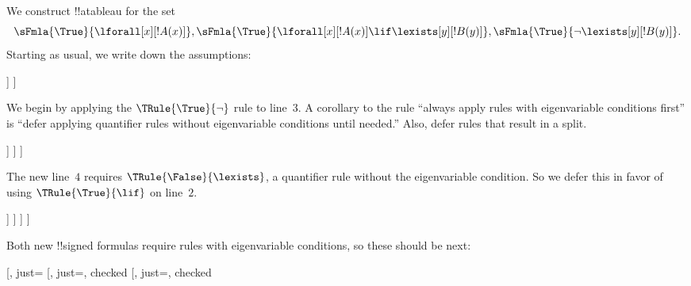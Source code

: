 \documentclass[../../../include/open-logic-section]{subfiles}
\begin{document}
\begin{ex}
We construct !!a{tableau} for the set
\[
\sFmla{\True}{\lforall[x][!A(x)]}, \sFmla{\True}{\lforall[x][!A(x)] 
  \lif \lexists[y][!B(y)]}, \sFmla{\True}{\lnot\lexists[y][!B(y)]}.
\]
Starting as usual, we write down the assumptions:
\begin{oltableau}
  [\sFmla{\True}{\lforall[x][\formula{A}(x)]}, just=\TAss
    [\sFmla{\True}{\lforall[x][\formula{A}(x)] \lif
        \lexists[y][\formula{B}(y)]}, just=\TAss
      [\sFmla{\True}{\lnot\lexists[y][\formula{B}(y)]}, just=\TAss
      ]
    ]
  ]
\end{oltableau}
We begin by applying the $\TRule{\True}{\lnot}$ rule to line~$3$. A
corollary to the rule ``always apply rules with eigenvariable
conditions first'' is ``defer applying quantifier rules without
eigenvariable conditions until needed.'' Also, defer rules that result
in a split.
\begin{oltableau}
  [\sFmla{\True}{\lforall[x][\formula{A}(x)]}, just=\TAss
    [\sFmla{\True}{\lforall[x][\formula{A}(x)] \lif
        \lexists[y][\formula{B}(y)]}, just=\TAss
      [\sFmla{\True}{\lnot\lexists[y][\formula{B}(y)]}, just=\TAss, checked
        [\sFmla{\False}{\lexists[y][\formula{B}(y)]}, just={\TRule{\True}{\lnot}[3]}]
      ]
    ]
  ]
\end{oltableau}
The new line~$4$ requires $\TRule{\False}{\lexists}$, a quantifier
rule without the eigenvariable condition. So we defer this in favor of
using $\TRule{\True}{\lif}$ on line~$2$.
\begin{oltableau}
  [\sFmla{\True}{\lforall[x][\formula{A}(x)]}, just=\TAss
    [\sFmla{\True}{\lforall[x][\formula{A}(x)] \lif
        \lexists[y][\formula{B}(y)]}, just=\TAss, checked
      [\sFmla{\True}{\lnot\lexists[y][\formula{B}(y)]}, just=\TAss, checked
        [\sFmla{\False}{\lexists[y][\formula{B}(y)]},
          just={\TRule{\True}{\lnot}[3]},
          [\sFmla{\False}{\lforall[x][\formula{A}(x)]}, just={\TRule{\True}{\lif}[2]}]
          [\sFmla{\True}{\lexists[y][\formula{B}(y)]}, just={\TRule{\True}{\lif}[2]}]
        ]
      ]
    ]
  ]
\end{oltableau}
Both new !!{signed formula}s require rules with eigenvariable conditions, so
these should be next:
\begin{oltableau}
  [\sFmla{\True}{\lforall[x][\formula{A}(x)]}, just=\TAss
    [\sFmla{\True}{\lforall[x][\formula{A}(x)] \lif
        \lexists[y][\formula{B}(y)]}, just=\TAss, checked
      [\sFmla{\True}{\lnot\lexists[y][\formula{B}(y)]}, just=\TAss, checked

\end{oltableau}
\end{ex}
\end{document}
